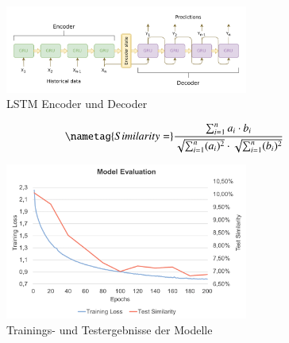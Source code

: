 \documentclass{aa}
\begin{document}
        \begin{figure}[h]
         \centering
         \includegraphics[width=8cm]{Lstm.png}
         \caption{LSTM Encoder und Decoder}
         \label{fig:lstm}
        \end{figure}
        
        \begin{equation}
         \nametag{Similarity =}\\
         \frac{\sum_{i=1}^{n} a_i \cdot b_i}{\sqrt{\sum_{i=1}^{n} (a_i)^2} \cdot \sqrt{\sum_{i=1}^{n} (b_i)^2}} 
        \label{eq:similarity}
        \end{equation}
        
        \begin{figure}[h]
         \centering
         \includegraphics[width=8cm]{model_evaluation.png}
         \caption{Trainings- und Testergebnisse der Modelle}
         \label{fig:model}
        \end{figure}



%
%
\end{document}
